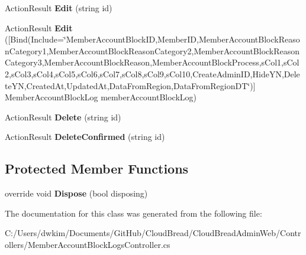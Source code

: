 \begin{DoxyCompactItemize}
\item 
Action\+Result {\bfseries Edit} (string id)\hypertarget{a00136_a00561b45ae5e34c72bde69d093a37812}{}\label{a00136_a00561b45ae5e34c72bde69d093a37812}

\item 
Action\+Result {\bfseries Edit} (\mbox{[}Bind(Include=\char`\"{}Member\+Account\+Block\+ID,Member\+ID,Member\+Account\+Block\+Reason\+Category1,Member\+Account\+Block\+Reason\+Category2,Member\+Account\+Block\+Reason\+Category3,Member\+Account\+Block\+Reason,Member\+Account\+Block\+Process,s\+Col1,s\+Col2,s\+Col3,s\+Col4,s\+Col5,s\+Col6,s\+Col7,s\+Col8,s\+Col9,s\+Col10,Create\+Admin\+ID,Hide\+YN,Delete\+YN,Created\+At,Updated\+At,Data\+From\+Region,Data\+From\+Region\+DT\char`\"{})\mbox{]} Member\+Account\+Block\+Log member\+Account\+Block\+Log)\hypertarget{a00136_a755fb108f13e226f65bcc7fe34adf5b6}{}\label{a00136_a755fb108f13e226f65bcc7fe34adf5b6}

\item 
Action\+Result {\bfseries Delete} (string id)\hypertarget{a00136_a01af082d42bbab54321d71eb1c34aebf}{}\label{a00136_a01af082d42bbab54321d71eb1c34aebf}

\item 
Action\+Result {\bfseries Delete\+Confirmed} (string id)\hypertarget{a00136_a3953e3d9423bb7007b0c8cf9cd707183}{}\label{a00136_a3953e3d9423bb7007b0c8cf9cd707183}

\end{DoxyCompactItemize}
\subsection*{Protected Member Functions}
\begin{DoxyCompactItemize}
\item 
override void {\bfseries Dispose} (bool disposing)\hypertarget{a00136_a56ca84b93fcf08799c2c42d5af114576}{}\label{a00136_a56ca84b93fcf08799c2c42d5af114576}

\end{DoxyCompactItemize}


The documentation for this class was generated from the following file\+:\begin{DoxyCompactItemize}
\item 
C\+:/\+Users/dwkim/\+Documents/\+Git\+Hub/\+Cloud\+Bread/\+Cloud\+Bread\+Admin\+Web/\+Controllers/Member\+Account\+Block\+Logs\+Controller.\+cs\end{DoxyCompactItemize}
